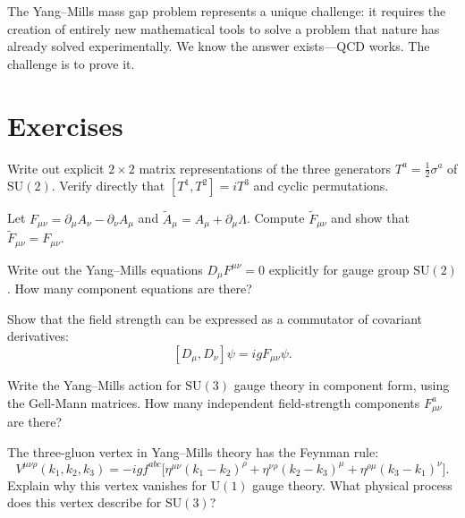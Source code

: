 The Yang--Mills mass gap problem represents a unique challenge: it requires the creation of entirely new mathematical tools to solve a problem that nature has already solved experimentally. We know the answer exists---QCD works. The challenge is to prove it.

\section{Exercises}

\begin{exercise}
\label{ex:su2-matrix}
Write out explicit $2 \times 2$ matrix representations of the three generators $T^a = \frac{1}{2}\sigma^a$ of $\mathrm{SU}(2)$. Verify directly that $[T^1, T^2] = iT^3$ and cyclic permutations.
\end{exercise}

\begin{exercise}
\label{ex:maxwell-gauge-inv}
Let $F_{\mu\nu} = \partial_\mu A_\nu - \partial_\nu A_\mu$ and $\tilde{A}_\mu = A_\mu + \partial_\mu \Lambda$. Compute $\tilde{F}_{\mu\nu}$ and show that $\tilde{F}_{\mu\nu} = F_{\mu\nu}$.
\end{exercise}

\begin{exercise}
\label{ex:ym-su2}
Write out the Yang--Mills equations $D_\mu F^{\mu\nu} = 0$ explicitly for gauge group $\mathrm{SU}(2)$. How many component equations are there?
\end{exercise}

\begin{exercise}
\label{ex:curvature-commutator}
Show that the field strength can be expressed as a commutator of covariant derivatives:
\[
[D_\mu, D_\nu]\psi = ig F_{\mu\nu}\psi.
\]
\end{exercise}

\begin{exercise}
\label{ex:ym-action-su3}
Write the Yang--Mills action for $\mathrm{SU}(3)$ gauge theory in component form, using the Gell-Mann matrices. How many independent field-strength components $F_{\mu\nu}^a$ are there?
\end{exercise}

\begin{exercise}
\label{ex:nonabelian-selfint}
The three-gluon vertex in Yang--Mills theory has the Feynman rule:
\[
V^{\mu\nu\rho}(k_1, k_2, k_3) = -ig f^{abc}\bigl[\eta^{\mu\nu}(k_1 - k_2)^\rho + \eta^{\nu\rho}(k_2 - k_3)^\mu + \eta^{\rho\mu}(k_3 - k_1)^\nu\bigr].
\]
Explain why this vertex vanishes for $\mathrm{U}(1)$ gauge theory. What physical process does this vertex describe for $\mathrm{SU}(3)$?
\end{exercise}

